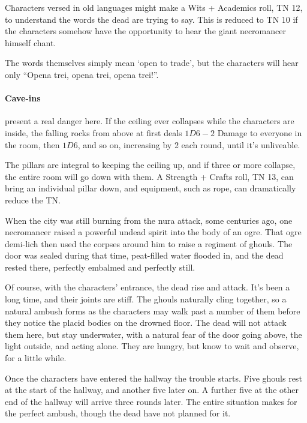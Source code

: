 \begin{multicols}{2}

Characters versed in old languages might make a Wits + Academics roll, TN 12, to understand the words the dead are trying to say.  This is reduced to TN 10 if the characters somehow have the opportunity to hear the giant necromancer himself chant.

The words themselves simply mean `open to trade', but the characters will hear only ``Opena trei, opena trei, opena trei!''.

\paragraph{Cave-ins} present a real danger here.  If the ceiling ever collapses while the characters are inside, the falling rocks from above at first deals $1D6-2$ Damage to everyone in the room, then $1D6$, and so on, increasing by 2 each round, until it's unliveable.


The pillars are integral to keeping the ceiling up, and if three or more collapse, the entire room will go down with them.  A Strength + Crafts roll, TN 13, can bring an individual pillar down, and equipment, such as rope, can dramatically reduce the TN.

When the city was still burning from the nura attack, some centuries ago, one necromancer raised a powerful undead spirit into the body of an ogre.
That ogre demi-lich then used the corpses around him to raise a regiment of ghouls.
The door was sealed during that time, peat-filled water flooded in, and the dead rested there, perfectly embalmed and perfectly still.

Of course, with the characters' entrance, the dead rise and attack.  It's been a long time, and their joints are stiff.  The ghouls naturally cling together, so a natural ambush forms as the characters may walk past a number of them before they notice the placid bodies on the drowned floor.  The dead will not attack them here, but stay underwater, with a natural fear of the door going above, the light outside, and acting alone.  They are hungry, but know to wait and observe, for a little while.

Once the characters have entered the hallway the trouble starts.  Five ghouls rest at the start of the hallway, and another five later on.  A further five at the other end of the hallway will arrive three rounds later.
The entire situation makes for the perfect ambush, though the dead have not planned for it.


\end{multicols}
